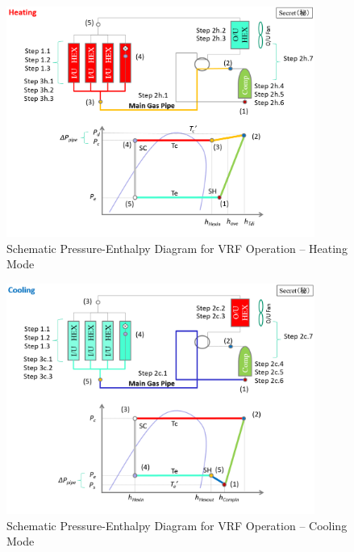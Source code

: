 \begin{figure}[hbtp] %
\centering
\includegraphics[width=0.9\textwidth, height=0.9\textheight, keepaspectratio=true]{media/VRF-FluidTCtrl-2a.png}
\caption{Schematic Pressure-Enthalpy Diagram for VRF Operation -- Heating Mode \label{fig:vrf-fluid-t-ctrl-2a}}
\end{figure}

\begin{figure}[hbtp] %
\centering
\includegraphics[width=0.9\textwidth, height=0.9\textheight, keepaspectratio=true]{media/VRF-FluidTCtrl-2b.png}
\caption{Schematic Pressure-Enthalpy Diagram for VRF Operation -- Cooling Mode \label{fig:vrf-fluid-t-ctrl-2b}}
\end{figure}

